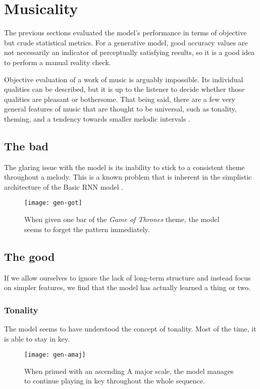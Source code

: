 \documentclass[../../report.tex]{subfiles}
\begin{document}
\section{Musicality}

The previous sections evaluated the model's performance in terms of objective
but crude statistical metrics. For a generative model, good accuracy values are
not necessarily an indicator of perceptually satisfying results, so it is a good
idea to perform a manual reality check.

Objective evaluation of a work of music is arguably impossible. Its individual
qualities can be described, but it is up to the listener to decide whether those
qualities are pleasant or bothersome. That being said, there are a few very
general features of music that are thought to be universal, such as tonality,
theming, and a tendency towards smaller melodic intervals \cite{Mehr2019}.

\subsection{The bad}

The glaring issue with the model is its inability to stick to a consistent theme
throughout a melody. This is a known problem that is inherent in the simplistic
architecture of the Basic RNN model \cite{Abolafia2016}.

\begin{figure}[h]
  \texttt{[image: gen-got]}
  \caption{When given one bar of the \emph{Game of Thrones} theme, the model
  seems to forget the pattern immediately.}
\end{figure}

\subsection{The good}

If we allow ourselves to ignore the lack of long-term structure and instead
focus on simpler features, we find that the model has actually learned a thing
or two.

\subsubsection{Tonality}
The model seems to have understood the concept of tonality. Most of the time, it
is able to stay in key.

\begin{figure}[h]
  \texttt{[image: gen-amaj]}
  \caption{When primed with an ascending A major scale, the model manages to
  continue playing in key throughout the whole sequence.}
\end{figure}
\end{document}
